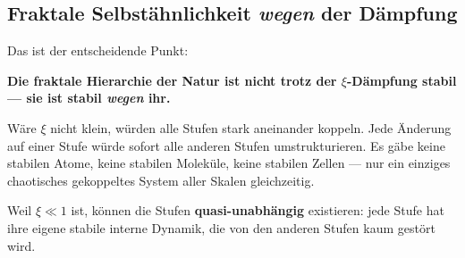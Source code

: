 \begin{center}
\end{center}

\subsection{Fraktale Selbstähnlichkeit \emph{wegen} der Dämpfung}

Das ist der entscheidende Punkt:

\textbf{Die fraktale Hierarchie der Natur ist nicht trotz
der $\xi$-Dämpfung stabil --- sie ist stabil
\emph{wegen} ihr.}

Wäre $\xi$ nicht klein, würden alle Stufen
stark aneinander koppeln.
Jede Änderung auf einer Stufe würde sofort
alle anderen Stufen umstrukturieren.
Es gäbe keine stabilen Atome, keine stabilen Moleküle,
keine stabilen Zellen --- nur ein einziges
chaotisches gekoppeltes System aller Skalen gleichzeitig.

Weil $\xi \ll 1$ ist, können die Stufen
\textbf{quasi-unabhängig} existieren:
jede Stufe hat ihre eigene stabile interne Dynamik,
die von den anderen Stufen kaum gestört wird.

